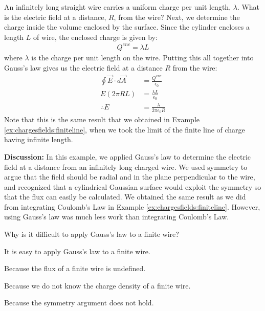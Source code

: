 \begin{example}{An infinitely long straight wire carries a uniform charge per unit length, $\lambda$. What is the electric field at a distance, $R$, from the wire?}
Next, we determine the charge inside the volume enclosed by the surface. Since the cylinder encloses a length $L$ of wire, the enclosed charge is given by:
\begin{align*}
Q^{enc}=\lambda L
\end{align*}
where $\lambda$ is the charge per unit length on the wire. Putting this all together into Gauss's law gives us the electric field at a distance $R$ from the wire:
\begin{align*}
\oint \vec E\cdot d\vec A&=\frac{Q^{enc}}{\epsilon_0} \\
E(2\pi R L) &= \frac{\lambda L}{\epsilon_0}\\
\therefore E&= \frac{\lambda}{2\pi\epsilon_0R}
\end{align*}
Note that this is the same result that we obtained in Example \ref{ex:chargesfields:finiteline}, when we took the limit of the finite line of charge having infinite length.

\textbf{Discussion: }In this example, we applied Gauss's law to determine the electric field at a distance from an infinitely long charged wire. We used symmetry to argue that the field should be radial and in the plane perpendicular to the wire, and recognized that a cylindrical Gaussian surface would exploit the symmetry so that the flux can easily be calculated. We obtained the same result as we did from integrating Coulomb's Law in Example \ref{ex:chargesfields:finiteline}. However, using Gauss's law was much less work than integrating Coulomb's Law.

\end{example}

\begin{checkpoint}\label{cp:gauss:gausswire}
	\begin{MCquestion}{Why is it difficult to apply Gauss's law to a finite wire?}
		\item It is easy to apply Gauss's law to a finite wire.
		\item Because the flux of a finite wire is undefined.
		\item Because we do not know the charge density of a finite wire.
		\item Because the symmetry argument does not hold. \correct
	\end{MCquestion}
\end{checkpoint}

